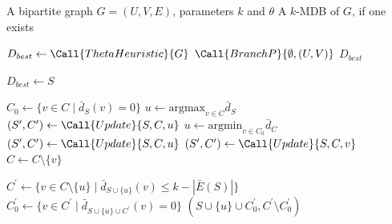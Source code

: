 \documentclass[conference]{IEEEtran}
\begin{document}
\begin{algorithm}[H]
\caption{Branch-and-Pivot}
\begin{minipage}{\linewidth}
\begin{algorithmic}
   \Require A bipartite graph $G = (U, V, E)$, parameters $k$ and $\theta$
   \Ensure A $k$-MDB of $G$, if one exists

   \State $D_{best} \gets \Call{ThetaHeuristic}{G}$
   \State $\Call{BranchP}{\emptyset, (U, V)}$
   \State \Return $D_{best}$

               \State $D_{best} \gets S$
           \EndIf
           \State \Return
       \EndIf

       \State $C_0 \gets \{v \in C \mid \bar{d}_S(v) = 0\}$
           \State $u \gets \text{argmax}_{v \in C}{\bar{d}_S}$
           \State $(S^\prime, C^\prime) \gets \Call{Update}{S, C, u}$
           \State {}
           \State {}
       \Else
           \State $u \gets \text{argmin}_{v \in C_0}\bar{d}_C$
               \State $(S^\prime, C^\prime) \gets \Call{Update}{S, C, u}$
               \State {}
               \State {}
           \Else
                   \State $(S^\prime, C^\prime) \gets \Call{Update}{S, C, v}$
                   \State {}
                   \State $C \gets C \setminus \{v\}$
               \EndFor
           \EndIf
       \EndIf
   \EndFunction

       \State $C^\prime \gets \{v \in C \setminus \{u\} \mid \bar{d}_{S \cup \{u\}}(v) \leq k - |\bar{E}(S)|\}$
       \State $C^\prime_0 \gets \{v \in C^\prime \mid \bar{d}_{S \cup \{u\} \cup C^\prime}(v) = 0\}$
       \State \Return $(S \cup \{u\} \cup C^\prime_0, C^\prime \setminus C^\prime_0)$
   \EndFunction

\end{algorithmic}
\end{minipage}
\end{algorithm}
\end{document}
